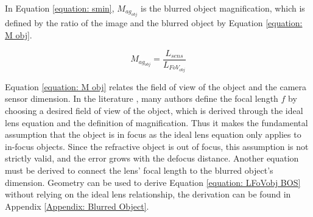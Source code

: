 \par In Equation \ref{equation: smin}, $M_{ag_{obj}}$ is the blurred object magnification, which is defined by the ratio of the image and the blurred object by Equation \ref{equation: M obj}.

\begin{equation}
    \label{equation: M obj}
    M_{ag_{obj}} = \frac{L_{sens}}{L_{FoV_{obj}}}
\end{equation}

\par Equation \ref{equation: M obj} relates the field of view of the object and the camera sensor dimension. In the literature \cite{Schmidt2025, Schwarz&Braukmann}, many authors define the focal length $f$ by choosing a desired field of view of the object, which is derived through the ideal lens equation and the definition of magnification. Thus it makes the fundamental assumption that the object is in focus as the ideal lens equation only applies to in-focus objects. Since the refractive object is out of focus, this assumption is not strictly valid, and the error grows with the defocus distance. Another equation must be derived to connect the lens' focal length to the blurred object's dimension. Geometry can be used to derive Equation \ref{equation: LFoVobj BOS} without relying on the ideal lens relationship, the derivation can be found in Appendix \ref{Appendix: Blurred Object}.



